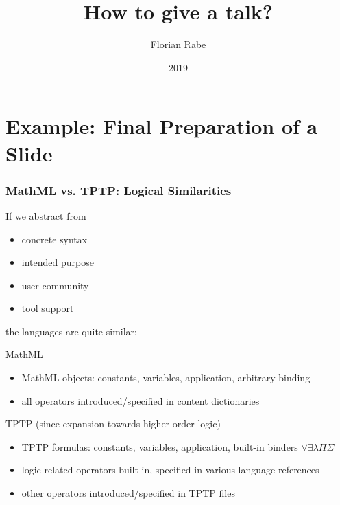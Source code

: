 \documentclass{beamer}
\begin{document}
\title{How to give a talk?}
\author{Florian Rabe}
\date{2019}
\begin{frame}
    \titlepage
\end{frame}

%

\section{Example: Final Preparation of a Slide}

\begin{frame}\frametitle{MathML vs. TPTP: Logical Similarities}
If we abstract from
\begin{itemize}
  \item concrete syntax
  \item intended purpose
  \item user community
  \item tool support
\end{itemize}
the languages are quite similar:

MathML
\begin{itemize}
 \item MathML objects: constants, variables, application, arbitrary binding
 \item all operators introduced/specified in content dictionaries
\end{itemize}
TPTP (since expansion towards higher-order logic)
\begin{itemize}
 \item TPTP formulas: constants, variables, application, built-in binders $\forall\exists\lambda\Pi\Sigma$
 \item logic-related operators built-in, specified in various language references
 \item other operators introduced/specified in TPTP files
\end{itemize}
\end{frame}
\end{document}

